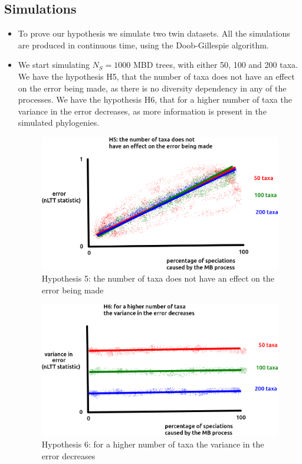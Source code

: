 \documentclass{article}
\begin{document}
\subsection{Simulations}
\begin{itemize}

\item To prove our hypothesis we simulate two twin datasets. 
All the simulations are produced in continuous time, 
using the Doob-Gillespie algorithm. 

\item We start simulating $N_{S} = 1000$ MBD trees,
with either 50, 100 and 200 taxa.
We have the hypothesis H5, that the number of taxa does not
have an effect on the error being made, as there is no
diversity dependency in any of the processes.
We have the hypothesis H6, that for a higher number of taxa 
the variance in the error decreases, as more information is present
in the simulated phylogenies.

\begin{figure}[!htbp]
  \includegraphics[width=\textwidth]{fig_h_5.png}
  \caption{
    Hypothesis 5: the number of taxa does not
    have an effect on the error being made
  }
  \label{fig_h_5}
\end{figure}

\begin{figure}[!htbp]
  \includegraphics[width=\textwidth]{fig_h_6.png}
  \caption{
    Hypothesis 6: for a higher number of taxa 
    the variance in the error decreases
  }
  \label{fig_h_6}
\end{figure}


\end{itemize}
\end{document}
